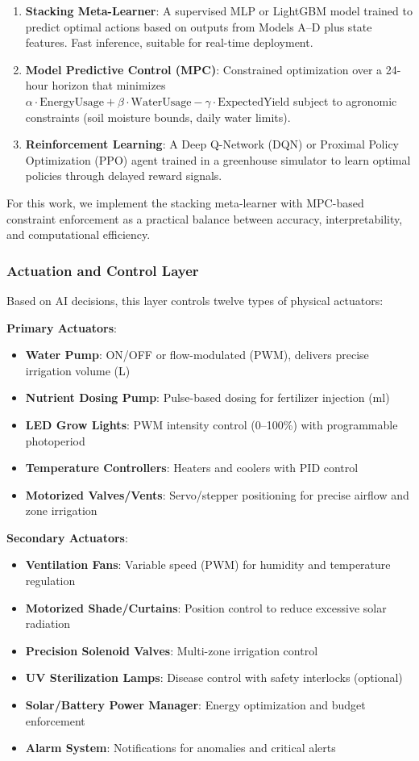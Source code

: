 \documentclass[conference]{IEEEtran}
\begin{document}
\begin{enumerate}
\item \textbf{Stacking Meta-Learner}: A supervised MLP or LightGBM model trained to predict optimal actions based on outputs from Models A--D plus state features. Fast inference, suitable for real-time deployment.

\item \textbf{Model Predictive Control (MPC)}: Constrained optimization over a 24-hour horizon that minimizes $\alpha \cdot \text{EnergyUsage} + \beta \cdot \text{WaterUsage} - \gamma \cdot \text{ExpectedYield}$ subject to agronomic constraints (soil moisture bounds, daily water limits).

\item \textbf{Reinforcement Learning}: A Deep Q-Network (DQN) or Proximal Policy Optimization (PPO) agent trained in a greenhouse simulator to learn optimal policies through delayed reward signals.
\end{enumerate}

For this work, we implement the stacking meta-learner with MPC-based constraint enforcement as a practical balance between accuracy, interpretability, and computational efficiency.

\subsubsection{Actuation and Control Layer}
Based on AI decisions, this layer controls twelve types of physical actuators:

\textbf{Primary Actuators}:
\begin{itemize}
\item \textbf{Water Pump}: ON/OFF or flow-modulated (PWM), delivers precise irrigation volume (L)
\item \textbf{Nutrient Dosing Pump}: Pulse-based dosing for fertilizer injection (ml)
\item \textbf{LED Grow Lights}: PWM intensity control (0--100\%) with programmable photoperiod
\item \textbf{Temperature Controllers}: Heaters and coolers with PID control
\item \textbf{Motorized Valves/Vents}: Servo/stepper positioning for precise airflow and zone irrigation
\end{itemize}

\textbf{Secondary Actuators}:
\begin{itemize}
\item \textbf{Ventilation Fans}: Variable speed (PWM) for humidity and temperature regulation
\item \textbf{Motorized Shade/Curtains}: Position control to reduce excessive solar radiation
\item \textbf{Precision Solenoid Valves}: Multi-zone irrigation control
\item \textbf{UV Sterilization Lamps}: Disease control with safety interlocks (optional)
\item \textbf{Solar/Battery Power Manager}: Energy optimization and budget enforcement
\item \textbf{Alarm System}: Notifications for anomalies and critical alerts
\end{itemize}
\end{document}
